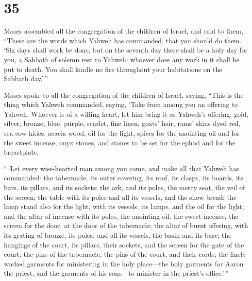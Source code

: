 \hypertarget{section-34}{%
\section{35}\label{section-34}}

 Moses assembled all the congregation of the children of
Israel, and said to them, ``These are the words which Yahweh has
commanded, that you should do them.  `Six days shall work
be done, but on the seventh day there shall be a holy day for you, a
Sabbath of solemn rest to Yahweh: whoever does any work in it shall be
put to death.  You shall kindle no fire throughout your
habitations on the Sabbath day.'\,''

 Moses spoke to all the congregation of the children of
Israel, saying, ``This is the thing which Yahweh commanded, saying,
 `Take from among you an offering to Yahweh. Whoever is of
a willing heart, let him bring it as Yahweh's offering: gold, silver,
bronze,  blue, purple, scarlet, fine linen, goats' hair,
 rams' skins dyed red, sea cow hides, acacia wood,
 oil for the light, spices for the anointing oil and for
the sweet incense,  onyx stones, and stones to be set for
the ephod and for the breastplate.

 ``\,`Let every wise-hearted man among you come, and make
all that Yahweh has commanded:  the tabernacle, its outer
covering, its roof, its clasps, its boards, its bars, its pillars, and
its sockets;  the ark, and its poles, the mercy seat, the
veil of the screen;  the table with its poles and all its
vessels, and the show bread;  the lamp stand also for the
light, with its vessels, its lamps, and the oil for the light;
 and the altar of incense with its poles, the anointing
oil, the sweet incense, the screen for the door, at the door of the
tabernacle;  the altar of burnt offering, with its
grating of bronze, its poles, and all its vessels, the basin and its
base;  the hangings of the court, its pillars, their
sockets, and the screen for the gate of the court;  the
pins of the tabernacle, the pins of the court, and their cords;
 the finely worked garments for ministering in the holy
place---the holy garments for Aaron the priest, and the garments of his
sons---to minister in the priest's office.'\,''


